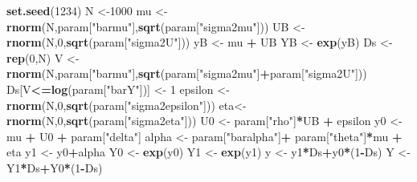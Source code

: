 \documentclass[]{book}
\newenvironment{Shaded}{\begin{snugshade}}{\end{snugshade}}
\newcommand{\DecValTok}[1]{\textcolor[rgb]{0.00,0.00,0.81}{#1}}
\newcommand{\KeywordTok}[1]{\textcolor[rgb]{0.13,0.29,0.53}{\textbf{#1}}}
\newcommand{\NormalTok}[1]{#1}
\newcommand{\OperatorTok}[1]{\textcolor[rgb]{0.81,0.36,0.00}{\textbf{#1}}}
\newcommand{\StringTok}[1]{\textcolor[rgb]{0.31,0.60,0.02}{#1}}
\theoremstyle{definition}
\theoremstyle{definition}
\theoremstyle{definition}
\theoremstyle{remark}
\begin{document}
\begin{Shaded}
\begin{Highlighting}[]
\KeywordTok{set.seed}\NormalTok{(}\DecValTok{1234}\NormalTok{)}
\NormalTok{N <-}\DecValTok{1000}
\NormalTok{mu <-}\StringTok{ }\KeywordTok{rnorm}\NormalTok{(N,param[}\StringTok{"barmu"}\NormalTok{],}\KeywordTok{sqrt}\NormalTok{(param[}\StringTok{"sigma2mu"}\NormalTok{]))}
\NormalTok{UB <-}\StringTok{ }\KeywordTok{rnorm}\NormalTok{(N,}\DecValTok{0}\NormalTok{,}\KeywordTok{sqrt}\NormalTok{(param[}\StringTok{"sigma2U"}\NormalTok{]))}
\NormalTok{yB <-}\StringTok{ }\NormalTok{mu }\OperatorTok{+}\StringTok{ }\NormalTok{UB }
\NormalTok{YB <-}\StringTok{ }\KeywordTok{exp}\NormalTok{(yB)}
\NormalTok{Ds <-}\StringTok{ }\KeywordTok{rep}\NormalTok{(}\DecValTok{0}\NormalTok{,N)}
\NormalTok{V <-}\StringTok{ }\KeywordTok{rnorm}\NormalTok{(N,param[}\StringTok{"barmu"}\NormalTok{],}\KeywordTok{sqrt}\NormalTok{(param[}\StringTok{"sigma2mu"}\NormalTok{]}\OperatorTok{+}\NormalTok{param[}\StringTok{"sigma2U"}\NormalTok{]))}
\NormalTok{Ds[V}\OperatorTok{<=}\KeywordTok{log}\NormalTok{(param[}\StringTok{"barY"}\NormalTok{])] <-}\StringTok{ }\DecValTok{1} 
\NormalTok{epsilon <-}\StringTok{ }\KeywordTok{rnorm}\NormalTok{(N,}\DecValTok{0}\NormalTok{,}\KeywordTok{sqrt}\NormalTok{(param[}\StringTok{"sigma2epsilon"}\NormalTok{]))}
\NormalTok{eta<-}\StringTok{ }\KeywordTok{rnorm}\NormalTok{(N,}\DecValTok{0}\NormalTok{,}\KeywordTok{sqrt}\NormalTok{(param[}\StringTok{"sigma2eta"}\NormalTok{]))}
\NormalTok{U0 <-}\StringTok{ }\NormalTok{param[}\StringTok{"rho"}\NormalTok{]}\OperatorTok{*}\NormalTok{UB }\OperatorTok{+}\StringTok{ }\NormalTok{epsilon}
\NormalTok{y0 <-}\StringTok{ }\NormalTok{mu }\OperatorTok{+}\StringTok{  }\NormalTok{U0 }\OperatorTok{+}\StringTok{ }\NormalTok{param[}\StringTok{"delta"}\NormalTok{]}
\NormalTok{alpha <-}\StringTok{ }\NormalTok{param[}\StringTok{"baralpha"}\NormalTok{]}\OperatorTok{+}\StringTok{  }\NormalTok{param[}\StringTok{"theta"}\NormalTok{]}\OperatorTok{*}\NormalTok{mu }\OperatorTok{+}\StringTok{ }\NormalTok{eta}
\NormalTok{y1 <-}\StringTok{ }\NormalTok{y0}\OperatorTok{+}\NormalTok{alpha}
\NormalTok{Y0 <-}\StringTok{ }\KeywordTok{exp}\NormalTok{(y0)}
\NormalTok{Y1 <-}\StringTok{ }\KeywordTok{exp}\NormalTok{(y1)}
\NormalTok{y <-}\StringTok{ }\NormalTok{y1}\OperatorTok{*}\NormalTok{Ds}\OperatorTok{+}\NormalTok{y0}\OperatorTok{*}\NormalTok{(}\DecValTok{1}\OperatorTok{-}\NormalTok{Ds)}
\NormalTok{Y <-}\StringTok{ }\NormalTok{Y1}\OperatorTok{*}\NormalTok{Ds}\OperatorTok{+}\NormalTok{Y0}\OperatorTok{*}\NormalTok{(}\DecValTok{1}\OperatorTok{-}\NormalTok{Ds)}
\end{Highlighting}
\end{Shaded}
\end{document}
